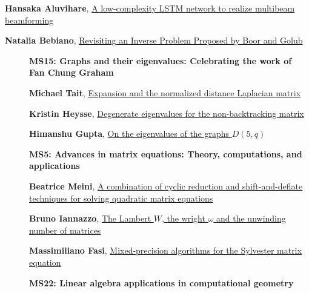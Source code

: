 \documentclass[ILAS2025-program.tex]{subfiles}
\begin{document}
\begin{description}
\begin{description}
{}
        \item[\info{14:30\textrm{--}15:00}] \hypertarget{up0059}{}\textbf{Hansaka Aluvihare}, \hyperlink{down0059}{A low-complexity LSTM network to realize multibeam beamforming
}
        \item[\info{15:00\textrm{--}15:30}] \hypertarget{up0060}{}\textbf{Natalia Bebiano}, \hyperlink{down0060}{Revisiting an Inverse Problem Proposed by Boor and Golub
}
        \end{description}
    \begin{description}
    \item[] {\color{mstitle}\textbf{MS15: Graphs and their eigenvalues: Celebrating the work of Fan Chung Graham}} 
    \item[] \hypertarget{up0061}{}\textbf{Michael Tait}, \hyperlink{down0061}{Expansion and the normalized distance Laplacian matrix}
        \item[] \hypertarget{up0062}{}\textbf{Kristin Heysse}, \hyperlink{down0062}{Degenerate eigenvalues for the non-backtracking matrix}
        \item[] \hypertarget{up0063}{}\textbf{Himanshu Gupta}, \hyperlink{down0063}{On the eigenvalues of the graphs $D(5, q)$}
        \end{description}
    \begin{description}
    \item[] {\color{mstitle}\textbf{MS5: Advances in matrix equations: Theory, computations, and applications}} 
    \item[] \hypertarget{up0064}{}\textbf{Beatrice Meini}, \hyperlink{down0064}{A combination of cyclic reduction and shift-and-deflate techniques for solving quadratic matrix equations
}
        \item[] \hypertarget{up0065}{}\textbf{Bruno Iannazzo}, \hyperlink{down0065}{The Lambert $W$, the wright $\omega$ and the unwinding number of matrices
}
        \item[] \hypertarget{up0066}{}\textbf{Massimiliano Fasi}, \hyperlink{down0066}{Mixed-precision algorithms for the Sylvester matrix equation}
        \end{description}
    \begin{description}
    \item[] {\color{mstitle}\textbf{MS22: Linear algebra applications in computational geometry}} 

\end{description}
\end{description}
\end{document}

